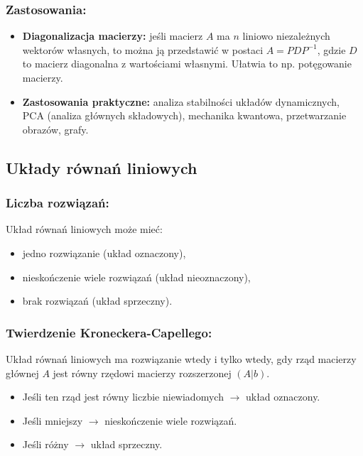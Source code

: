 \subsubsection*{Zastosowania:}
\begin{itemize}
    \item \textbf{Diagonalizacja macierzy:} jeśli macierz $A$ ma $n$ liniowo niezależnych wektorów własnych, to można ją przedstawić w postaci $A = PDP^{-1}$, gdzie $D$ to macierz diagonalna z wartościami własnymi. Ułatwia to np. potęgowanie macierzy.
    \item \textbf{Zastosowania praktyczne:} analiza stabilności układów dynamicznych, PCA (analiza głównych składowych), mechanika kwantowa, przetwarzanie obrazów, grafy.
\end{itemize}

\subsection{Układy równań liniowych}
\subsubsection*{Liczba rozwiązań:}
Układ równań liniowych może mieć:
\begin{itemize}
    \item jedno rozwiązanie (układ oznaczony),
    \item nieskończenie wiele rozwiązań (układ nieoznaczony),
    \item brak rozwiązań (układ sprzeczny).
\end{itemize}

\subsubsection*{Twierdzenie Kroneckera-Capellego:}
Układ równań liniowych ma rozwiązanie wtedy i tylko wtedy, gdy rząd macierzy głównej $A$ jest równy rzędowi macierzy rozszerzonej $(A|b)$.
\begin{itemize}
    \item Jeśli ten rząd jest równy liczbie niewiadomych $\rightarrow$ układ oznaczony.
    \item Jeśli mniejszy $\rightarrow$ nieskończenie wiele rozwiązań.
    \item Jeśli różny $\rightarrow$ układ sprzeczny.
\end{itemize}

